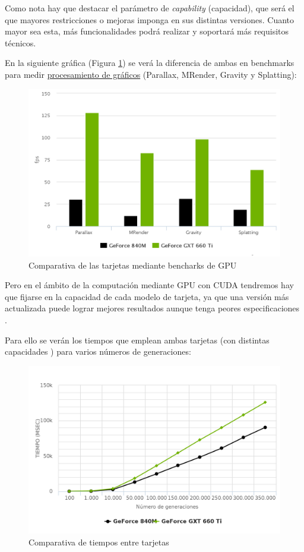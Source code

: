 \bigskip
Como nota hay que destacar el parámetro de \textit{capability} (capacidad), que será el que mayores restricciones o mejoras imponga en sus distintas versiones. Cuanto mayor sea esta, más funcionalidades podrá realizar y soportará más requisitos técnicos.

\bigskip
En la siguiente gráfica (Figura \ref{fig:grafico_benchmarks}) se verá la diferencia de ambas en benchmarks para medir \underline{procesamiento de gráficos} (Parallax, MRender, Gravity y Splatting):

\begin{figure}[h]
	\centering
	\includegraphics[width=0.6\linewidth]{../images/grafico_benchmarks}
	\caption[Comparativa de las tarjetas mediante bencharks de GPU]{Comparativa de las tarjetas mediante bencharks de GPU}
	\label{fig:grafico_benchmarks}
\end{figure}


\newpage %
Pero en el ámbito de la computación mediante GPU con CUDA tendremos hay que fijarse en la capacidad de cada modelo de tarjeta, ya que una versión más actualizada puede lograr mejores resultados aunque tenga peores especificaciones \cite{capacidadescuda}.

\bigskip
Para ello se verán los tiempos que emplean ambas tarjetas (con distintas capacidades \cite{capacidades}) para varios números de generaciones:

\bigskip
\begin{figure}[h]
	\centering
	\includegraphics[width=0.9\linewidth]{../images/grafico_tiempos}
	\caption[Comparativa de tiempos entre tarjetas]{Comparativa de tiempos entre tarjetas}
	\label{fig:grafico_tiempos}
\end{figure}

